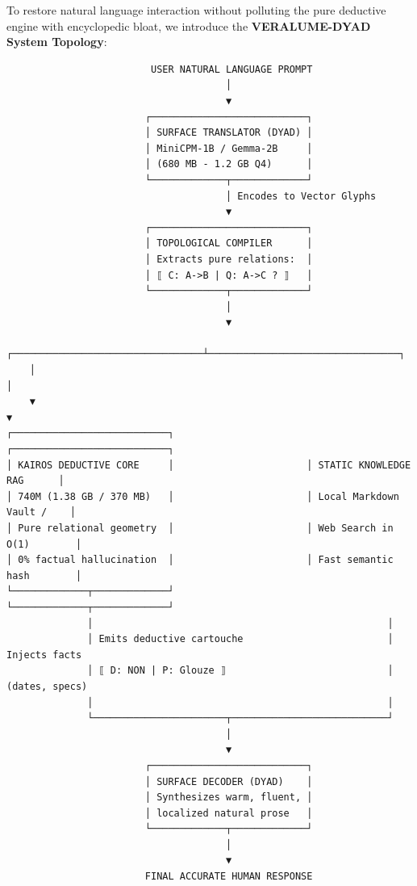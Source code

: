 \documentclass[10pt,twocolumn]{article}
\begin{document}
To restore natural language interaction without polluting the pure deductive engine with encyclopedic bloat, we introduce the \textbf{VERALUME-DYAD System Topology}:

\begin{verbatim}
                         USER NATURAL LANGUAGE PROMPT
                                      │
                                      ▼
                        ┌───────────────────────────┐
                        │ SURFACE TRANSLATOR (DYAD) │
                        │ MiniCPM-1B / Gemma-2B     │
                        │ (680 MB - 1.2 GB Q4)      │
                        └─────────────┬─────────────┘
                                      │ Encodes to Vector Glyphs
                                      ▼
                        ┌───────────────────────────┐
                        │ TOPOLOGICAL COMPILER      │
                        │ Extracts pure relations:  │
                        │ ⟦ C: A->B | Q: A->C ? ⟧   │
                        └─────────────┬─────────────┘
                                      │
                                      ▼
    ┌─────────────────────────────────┴─────────────────────────────────┐
    │                                                                   │
    ▼                                                                   ▼
┌───────────────────────────┐                       ┌───────────────────────────┐
│ KAIROS DEDUCTIVE CORE     │                       │ STATIC KNOWLEDGE RAG      │
│ 740M (1.38 GB / 370 MB)   │                       │ Local Markdown Vault /    │
│ Pure relational geometry  │                       │ Web Search in O(1)        │
│ 0% factual hallucination  │                       │ Fast semantic hash        │
└─────────────┬─────────────┘                       └─────────────┬─────────────┘
              │                                                   │
              │ Emits deductive cartouche                         │ Injects facts
              │ ⟦ D: NON | P: Glouze ⟧                            │ (dates, specs)
              │                                                   │
              └───────────────────────┬───────────────────────────┘
                                      │
                                      ▼
                        ┌───────────────────────────┐
                        │ SURFACE DECODER (DYAD)    │
                        │ Synthesizes warm, fluent, │
                        │ localized natural prose   │
                        └─────────────┬─────────────┘
                                      │
                                      ▼
                        FINAL ACCURATE HUMAN RESPONSE
\end{verbatim}
\end{document}
